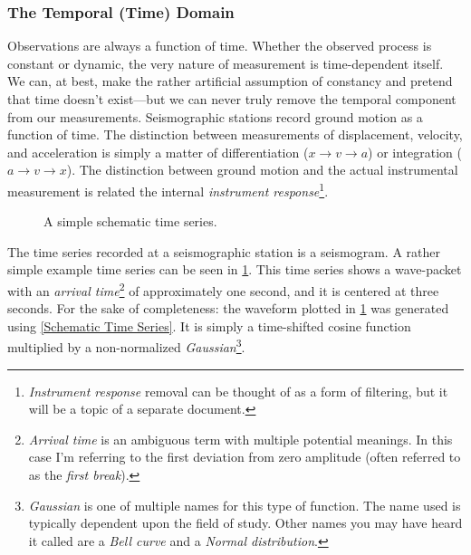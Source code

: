 \documentclass[american, twoside]{article}
\begin{document}
\subsubsection{The Temporal (Time) Domain} \label{Background:Math:Temporal}
Observations are always a function of time. Whether the observed process is constant or dynamic, the very nature of measurement is time-dependent itself. We can, at best, make the
rather artificial assumption of constancy and pretend that time doesn't exist---but we can never truly remove the temporal component from our measurements. Seismographic stations
record ground motion as a function of time. The distinction between measurements of displacement, velocity, and acceleration is simply a matter of differentiation ($x\rightarrow v\rightarrow a$)
or integration ($a\rightarrow v \rightarrow x$). The distinction between ground motion and the actual instrumental measurement is related the internal \textit{instrument response}\footnote{\textit{Instrument response}
removal can be thought of as a form of filtering, but it will be a topic of a separate document.}.

\begin{center}
    \begin{figure}[ht]
        \caption[Schematic Time Series]{A simple schematic time series.} \label{figure1}
    \end{figure}
\end{center}

The time series recorded at a seismographic station is a seismogram. A rather simple example time series can be seen in \cref{figure1}.
This time series shows a wave-packet with an \textit{arrival time}\footnote{\textit{Arrival time} is an ambiguous term with multiple
potential meanings. In this case I'm referring to the first deviation from zero amplitude (often referred to as the \textit{first break}).} of approximately one second,
and it is centered at three seconds. For the sake of completeness: the waveform plotted in \cref{figure1} was generated using \cref{Schematic Time Series}.
It is simply a time-shifted cosine function multiplied by a non-normalized \textit{Gaussian}\footnote{\textit{Gaussian} is one of multiple names for this type of function.
The name used is typically dependent upon the field of study. Other names you may have heard it called are a \textit{Bell curve} and a \textit{Normal distribution}.}.
\end{document}
